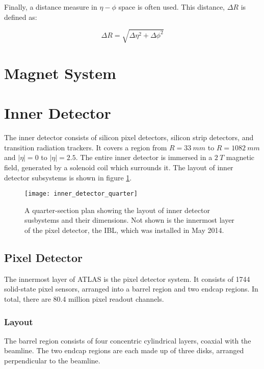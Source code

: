 Finally, a distance measure in $\eta-\phi$ space is often used. This
distance, $\Delta R$ is defined as:

\begin{equation}
\Delta R = \sqrt{\Delta\eta^2+\Delta\phi^2}
\end{equation}

\section{Magnet System}

\section{Inner Detector}

The inner detector consists of silicon pixel detectors, silicon strip
detectors, and transition radiation trackers. It covers a region from
$R = 33~mm$ to $R = 1082~mm$ and $|\eta| = 0$ to $|\eta| = 2.5$. The entire inner
detector is immersed in a $2~T$ magnetic field, generated by a
solenoid coil which surrounds it.\cite{atlas-detector-2008} The layout of inner detector
subsystems is shown in figure \ref{fig:inner_detector_quarter}.

\begin{figure}[h]
\texttt{[image: inner\_detector\_quarter]}
\caption{A quarter-section plan showing the layout of inner detector
  susbystems and their dimensions. Not shown is the innermost layer of
the pixel detector, the IBL, which was installed in May 2014.}
\label{fig:inner_detector_quarter}
\end{figure}

\subsection{Pixel Detector}

The innermost layer of ATLAS is the pixel detector system. It consists
of 1744 solid-state pixel sensors, arranged into a barrel region and two endcap
regions. In total, there are 80.4 million pixel readout channels. \cite{atlas-detector-2008}

\subsubsection{Layout}
The barrel region consists of four
concentric cylindrical layers, coaxial with the beamline. The two endcap regions are each made up
of three disks, arranged perpendicular to the beamline.

